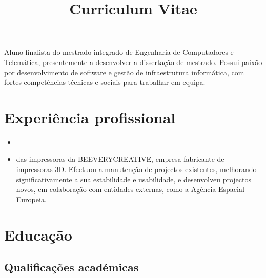 \documentclass[11pt,a4paper,sans]{moderncv}        %
\title{Curriculum Vitae}                               %
\begin{document}
\makecvtitle

\small{Aluno finalista do mestrado integrado de Engenharia de Computadores e Telemática, presentemente a desenvolver a dissertação de mestrado. Possui paixão por desenvolvimento de software e gestão de infraestrutura informática, com fortes competências técnicas e sociais para trabalhar em equipa.}

\section{Experiência profissional}

\vspace{6pt}

\begin{itemize}

\item{}

\vspace{6pt}

\item{ das impressoras da BEEVERYCREATIVE, empresa fabricante de impressoras 3D. Efectuou a manutenção de projectos existentes, melhorando significativamente a sua estabilidade e usabilidade, e desenvolveu projectos novos, em colaboração com entidades externas, como a Agência Espacial Europeia.}

\end{itemize}

\section{Educação}

\vspace{5pt}

\subsection{Qualificações académicas}
\end{document}
